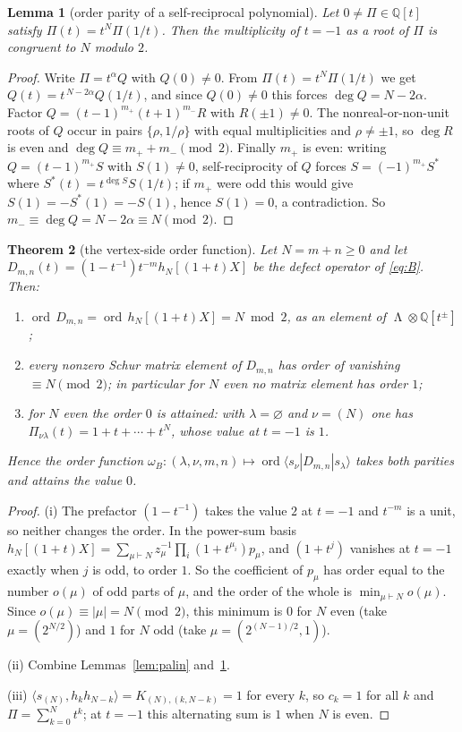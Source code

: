 \documentclass[11pt]{article}
\newtheorem{theorem}{Theorem}[section]
\newtheorem{lemma}[theorem]{Lemma}
\theoremstyle{definition}
\DeclareMathOperator{\Lam}{\Lambda}
\newcommand{\Q}{\mathbb{Q}}
\newcommand{\ord}{\operatorname{ord}}
\begin{document}
\begin{lemma}[order parity of a self-reciprocal polynomial]\label{lem:selfrec}
Let $0\neq \Pi\in\Q[t]$ satisfy $\Pi(t)=t^{N}\Pi(1/t)$.  Then the multiplicity of $t=-1$
as a root of $\Pi$ is congruent to $N$ modulo $2$.
\end{lemma}

\begin{proof}
Write $\Pi=t^{\alpha}Q$ with $Q(0)\neq0$.  From $\Pi(t)=t^N\Pi(1/t)$ we get
$Q(t)=t^{\,N-2\alpha}Q(1/t)$, and since $Q(0)\neq0$ this forces $\deg Q=N-2\alpha$.
Factor $Q=(t-1)^{m_+}(t+1)^{m_-}R$ with $R(\pm1)\neq0$.  The nonreal-or-non-unit roots of
$Q$ occur in pairs $\{\rho,1/\rho\}$ with equal multiplicities and $\rho\neq\pm1$, so
$\deg R$ is even and $\deg Q\equiv m_++m_-\pmod2$.  Finally $m_+$ is even: writing
$Q=(t-1)^{m_+}S$ with $S(1)\neq0$, self-reciprocity of $Q$ forces $S=(-1)^{m_+}S^{*}$ where
$S^{*}(t)=t^{\deg S}S(1/t)$; if $m_+$ were odd this would give $S(1)=-S^{*}(1)=-S(1)$,
hence $S(1)=0$, a contradiction.  So
$m_-\equiv\deg Q=N-2\alpha\equiv N\pmod2$.
\end{proof}

\begin{theorem}[the vertex-side order function]\label{thm:B}
Let $N=m+n\ge0$ and let $D_{m,n}(t)=(1-t^{-1})t^{-m}h_{N}[(1+t)X]$ be the defect operator
of \eqref{eq:B}.  Then:
\begin{enumerate}
\item[(i)] $\ord\,D_{m,n}=\ord\,h_N[(1+t)X]=N\bmod 2$, as an element of
$\Lam\otimes\Q[t^{\pm}]$;
\item[(ii)] every nonzero Schur matrix element of $D_{m,n}$ has order of vanishing
$\equiv N\pmod 2$; in particular for $N$ \emph{even} no matrix element has order $1$;
\item[(iii)] for $N$ even the order $0$ is attained: with $\lambda=\varnothing$ and
$\nu=(N)$ one has $\Pi_{\nu\lambda}(t)=1+t+\cdots+t^{N}$, whose value at $t=-1$ is $1$.
\end{enumerate}
Hence the order function
$\omega_B:(\lambda,\nu,m,n)\mapsto\ord\langle s_\nu|D_{m,n}|s_\lambda\rangle$ takes both
parities and attains the value $0$.
\end{theorem}

\begin{proof}
(i) The prefactor $(1-t^{-1})$ takes the value $2$ at $t=-1$ and $t^{-m}$ is a unit, so
neither changes the order.  In the power-sum basis
$h_N[(1+t)X]=\sum_{\mu\vdash N}z_\mu^{-1}\prod_i(1+t^{\mu_i})p_\mu$, and $(1+t^{j})$
vanishes at $t=-1$ exactly when $j$ is odd, to order $1$.  So the coefficient of $p_\mu$ has
order equal to the number $o(\mu)$ of odd parts of $\mu$, and the order of the whole is
$\min_{\mu\vdash N}o(\mu)$.  Since $o(\mu)\equiv|\mu|=N\pmod2$, this minimum is $0$ for $N$
even (take $\mu=(2^{N/2})$) and $1$ for $N$ odd (take $\mu=(2^{(N-1)/2},1)$).

(ii) Combine Lemmas~\ref{lem:palin} and~\ref{lem:selfrec}.

(iii) $\langle s_{(N)},h_kh_{N-k}\rangle=K_{(N),(k,N-k)}=1$ for every $k$, so $c_k=1$ for
all $k$ and $\Pi=\sum_{k=0}^Nt^{k}$; at $t=-1$ this alternating sum is $1$ when $N$ is even.
\end{proof}
\end{document}
